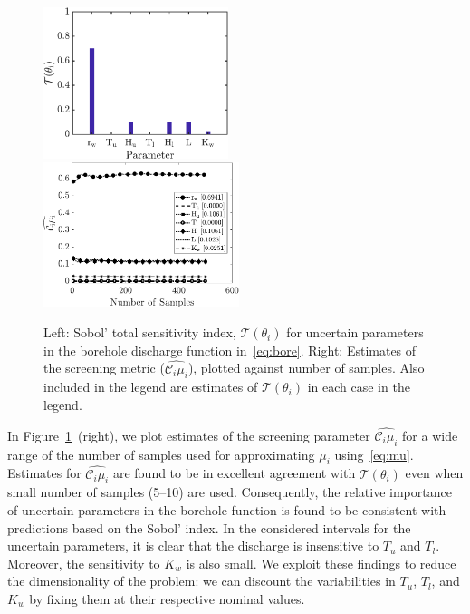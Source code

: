 \begin{figure}[htbp]
 \begin{center}
  \includegraphics[width=0.48\textwidth]{./Figures/sense_borehole}
  \includegraphics[width=0.51\textwidth]{./Figures/ub_conv_borehole}
\caption{
Left: Sobol' total sensitivity index, $\mathcal{T}(\theta_i)$ for uncertain
parameters in the
borehole discharge function in~\eqref{eq:bore}. Right: 
Estimates of the screening metric ($\widehat{\mathcal{C}_i\mu_i}$), plotted
against number of samples. Also included in the legend are estimates of
$\mathcal{T}(\theta_i)$ in each case in the legend.}
\label{fig:sense_bore}
\end{center}
\end{figure}

In Figure~\ref{fig:sense_bore}~(right), we plot estimates of the screening parameter 
$\widehat{\mathcal{C}_i\mu_i}$ for a wide range of the number of 
samples used for approximating $\mu_i$ using~\eqref{eq:mu}.
Estimates for $\widehat{\mathcal{C}_i\mu_i}$ are found to be in excellent agreement
with $\mathcal{T}(\theta_i)$ even when small number of samples (5--10) are used. 
Consequently, the relative importance of uncertain 
parameters in the borehole function is found to be consistent 
with predictions based on the Sobol' index. 
In the considered intervals for the uncertain parameters, it is clear 
that the discharge is insensitive to $T_u$ and $T_l$. 
Moreover, the sensitivity to $K_w$ is also small. We exploit these findings to reduce
the dimensionality of the problem: we can 
discount the variabilities in $T_u$, $T_l$, and $K_w$ by fixing 
them at their respective nominal values. 

